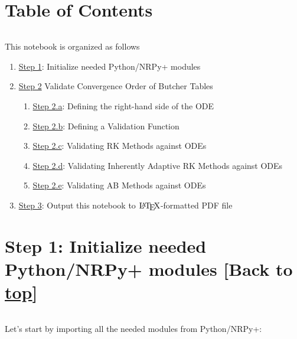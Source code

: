 \documentclass[landscape,letterpaper,10pt,english]{article}
\providecommand{\tightlist}{%
      \setlength{\itemsep}{0pt}\setlength{\parskip}{0pt}}
\let\Oldlatex\LaTeX
\renewcommand{\LaTeX}{\textrm{\Oldlatex}}
\begin{document}
    \hypertarget{table-of-contents}{%
\section{Table of Contents}\label{table-of-contents}}

\[\label{toc}\]

This notebook is organized as follows

\begin{enumerate}
\def\labelenumi{\arabic{enumi}.}
\tightlist
\item
  \hyperref[initializenrpy]{Step 1}: Initialize needed Python/NRPy+
  modules
\item
  \hyperref[table_validate]{Step 2} Validate Convergence Order of
  Butcher Tables

  \begin{enumerate}
  \def\labelenumii{\arabic{enumii}.}
  \tightlist
  \item
    \hyperref[rhs]{Step 2.a}: Defining the right-hand side of the ODE
  \item
    \hyperref[validfunc]{Step 2.b}: Defining a Validation Function
  \item
    \hyperref[rkvalid]{Step 2.c}: Validating RK Methods against ODEs
  \item
    \hyperref[arkvalid]{Step 2.d}: Validating Inherently Adaptive RK
    Methods against ODEs
  \item
    \hyperref[abvalid]{Step 2.e}: Validating AB Methods against ODEs
  \end{enumerate}
\item
  \hyperref[latex_pdf_output]{Step 3}: Output this notebook to
  \(\LaTeX\)-formatted PDF file
\end{enumerate}

    \hypertarget{step-1-initialize-needed-pythonnrpy-modules-back-to-top}{%
\section{\texorpdfstring{Step 1: Initialize needed Python/NRPy+ modules
{[}Back to
\hyperref[toc]{top}{]}}{Step 1: Initialize needed Python/NRPy+ modules {[}Back to {]}}}\label{step-1-initialize-needed-pythonnrpy-modules-back-to-top}}

\[\label{initializenrpy}\]

Let's start by importing all the needed modules from Python/NRPy+:
\end{document}
